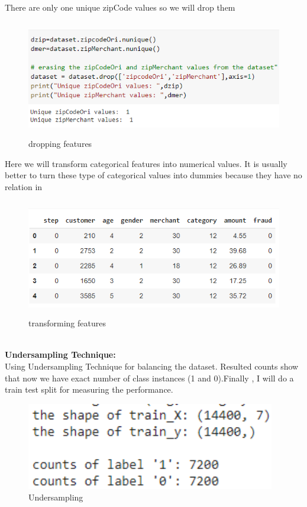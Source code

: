 \documentclass[12pt]{article}
\begin{document}
There are only one unique zipCode values so we will drop them
 \begin{figure}[htbp]
    \centering
    \includegraphics[height=2in]{i20.png}
    \caption{dropping features}
    \label{fig:galaxy}
\end{figure}
Here we will transform categorical features into numerical values. It is usually better to turn these type of categorical values into dummies because they have no relation in 
 \begin{figure}[htbp]
    \centering
    \includegraphics[height=2in]{i22.png}
    \caption{transforming features}
    \label{fig:galaxy}
\end{figure}
\\
\textbf{Undersampling Technique:}\\
Using  Undersampling Technique  for balancing the dataset. Resulted counts show that now we have exact number of class instances (1 and 0).Finally  ,
I will do a train test split for measuring the performance.
 \begin{figure}[htbp]
    \centering
    \includegraphics[height=1.5in]{i24.png}
    \caption{Undersampling }
    \label{fig:galaxy}
\end{figure}
\newline
\newline
\end{document}
